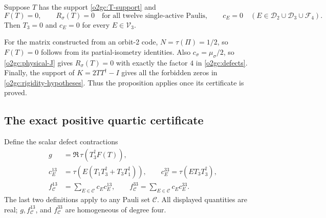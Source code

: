 \begin{proposition}
\label{o2gc:prop-rigidity}
Suppose \(T\) has the support \eqref{o2gc:T-support} and
\begin{equation}
 F(T)=0,\qquad R_\sigma(T)=0
 \quad\text{for all twelve single-active Paulis},\qquad
 c_E=0\quad(E\in\mathcal D_2\cup\mathcal D_3\cup\mathcal F_4).
 \label{o2gc:rigidity-hypotheses}
\end{equation}
Then \(T_3=0\) and \(c_E=0\) for every \(E\in\mathcal V_3\).
\end{proposition}

For the matrix constructed from an orbit-2 code,
\(N=\tau(\Pi)=1/2\), so \(F(T)=0\) follows from its partial-isometry
identities. Also \(c_\sigma=\mu_\sigma/2\), so
\eqref{o2gc:physical-J} gives \(R_\sigma(T)=0\) with exactly the
factor \(4\) in \eqref{o2gc:defects}. Finally, the support of
\(K=2TT^\dagger-I\) gives all the forbidden zeros in
\eqref{o2gc:rigidity-hypotheses}. Thus the proposition applies once
its certificate is proved.

\subsection{The exact positive quartic certificate}
\label{o2gc:subsec-certificate}

Define the scalar defect contractions
\begin{align}
 g&=\Re\,\tau(T_3^\dagger F(T)),\nonumber\\
 c_E^{13}&=\tau\!\left(E(T_1T_3^\dagger+T_3T_1^\dagger)\right),
 \qquad c_E^{33}=\tau(ET_3T_3^\dagger),\nonumber\\
 f_{\mathcal C}^{13}&=\sum_{E\in\mathcal C}c_Ec_E^{13},\qquad
 f_{\mathcal C}^{33}=\sum_{E\in\mathcal C}c_Ec_E^{33}.
 \label{o2gc:scalar-contractions}
\end{align}
The last two definitions apply to any Pauli set \(\mathcal C\).
All displayed quantities are real; \(g,f_{\mathcal C}^{13}\), and
\(f_{\mathcal C}^{33}\) are homogeneous of degree four.

